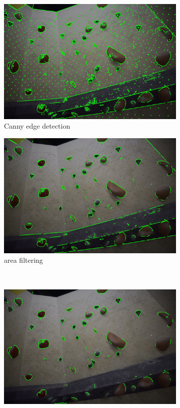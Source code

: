 \documentclass[final]{cvpr}
\begin{document}
\begin{figure}[t]
\centering
\begin{subfigure}{0.49\linewidth}
\centering
\includegraphics[width = \linewidth]{img/edges/4-contours.jpg}
\caption{Canny edge detection}
\label{fig:edges:a}
\end{subfigure}
\begin{subfigure}{0.49\linewidth}
\centering
\includegraphics[width = \linewidth]{img/edges/5-contours-area-filter.jpg}
\caption{area filtering}
\label{fig:edges:b}
\end{subfigure}
\\[0.5em]
\begin{subfigure}{1\linewidth}
\centering
\includegraphics[width = \linewidth]{img/edges/6-contours-straight-filter.jpg}

\end{subfigure}
\end{figure}
\end{document}
